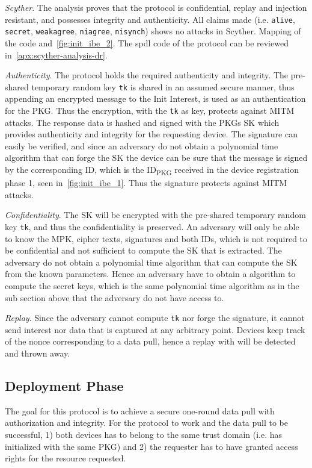 \textit{Scyther}.
The analysis proves that the protocol is confidential, replay and injection resistant, and possesses integrity and authenticity.
All claims made (i.e. \texttt{alive}, \texttt{secret}, \texttt{weakagree}, \texttt{niagree}, \texttt{nisynch}) shows no attacks in Scyther. 
 Mapping of the code and~\autoref{fig:init_ibe_2}.
The \gls{spdl} code of the protocol can be reviewed in~\autoref{apx:scyther-analysis-dr}.

\textit{Authenticity}.
The protocol holds the required authenticity and integrity. 
The pre-shared temporary random key \texttt{tk} is shared in an assumed secure manner, thus appending an encrypted message to the Init Interest, is used as an authentication for the \gls{PKG}.
Thus the encryption, with the \texttt{tk} as key, protects against \gls{MITM} attacks.
The response \gls{data} is hashed and signed with the \gls{PKG}s \gls{SK} which provides authenticity and integrity for the requesting device.
The signature can easily be verified, and since an adversary do not obtain a polynomial time algorithm that can forge the \gls{SK} the device can be sure that the message is signed by the corresponding ID, which is the ID\textsubscript{PKG} received in the device registration phase 1, seen in~\autoref{fig:init_ibe_1}.
Thus the signature protects against \gls{MITM} attacks.

\textit{Confidentiality}. 
The \gls{SK} will be encrypted with the pre-shared temporary random key \texttt{tk}, and thus the confidentiality is preserved.
An adversary will only be able to know the \gls{MPK}, cipher texts, signatures and both IDs, which is not required to be confidential and not sufficient to compute the \gls{SK} that is extracted. 
The adversary do not obtain a polynomial time algorithm that can compute the \gls{SK} from the known parameters.
Hence an adversary have to obtain a algorithm to compute the secret keys, which is the same polynomial time algorithm as in the sub section above that the adversary do not have access to.

\textit{Replay}.
Since the adversary cannot compute \texttt{tk} nor forge the signature, it cannot send \gls{interest} nor \gls{data} that is captured at any arbitrary point. 
Devices keep track of the nonce corresponding to a data pull, hence a replay with will be detected and thrown away.

\subsection{Deployment Phase}\label{data_pull}
The goal for this protocol is to achieve a secure one-round data pull with authorization and integrity.
For the protocol to work and the data pull to be successful, 1) both devices has to belong to the same trust domain (i.e. has initialized with the same \gls{PKG}) and 2) the requester has to have granted access rights for the resource requested.

